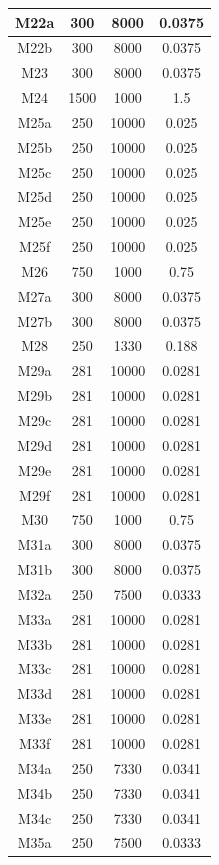 \documentclass[journal]{IEEEtran}
\begin{document}
\begin{table}
\begin{tabular}{|c|c|c|c|}
\hline M22a & 300 & 8000 & 0.0375 \\
\hline M22b & 300 & 8000 & 0.0375 \\
\hline M23 & 300 & 8000 & 0.0375 \\
\hline M24 & 1500 & 1000 & 1.5 \\
\hline M25a & 250 & 10000 & 0.025 \\
\hline M25b & 250 & 10000 & 0.025  \\
\hline M25c & 250 & 10000 & 0.025 \\
\hline M25d & 250 & 10000 & 0.025 \\
\hline M25e & 250 & 10000 & 0.025 \\
\hline M25f & 250 & 10000 & 0.025 \\
\hline M26 & 750 & 1000 & 0.75 \\
\hline M27a & 300 & 8000 & 0.0375 \\
\hline M27b & 300 & 8000 & 0.0375  \\
\hline M28 & 250 & 1330 & 0.188 \\
\hline M29a & 281 & 10000 & 0.0281 \\
\hline M29b & 281 & 10000 & 0.0281  \\
\hline M29c & 281 & 10000 & 0.0281 \\
\hline M29d & 281 & 10000 & 0.0281 \\
\hline M29e & 281 & 10000 & 0.0281 \\
\hline M29f & 281 & 10000 & 0.0281 \\
\hline M30 & 750 & 1000 & 0.75 \\
\hline M31a & 300 & 8000 & 0.0375 \\
\hline M31b & 300 & 8000 & 0.0375  \\
\hline M32a & 250 & 7500 & 0.0333  \\
\hline M33a & 281 & 10000 & 0.0281 \\
\hline M33b & 281 & 10000 & 0.0281   \\
\hline M33c & 281 & 10000 & 0.0281   \\
\hline M33d & 281 & 10000 & 0.0281   \\
\hline M33e & 281 & 10000 & 0.0281   \\
\hline M33f & 281 & 10000 & 0.0281  \\
\hline M34a & 250 & 7330 & 0.0341 \\
\hline M34b & 250 & 7330 & 0.0341  \\
\hline M34c & 250 & 7330 & 0.0341  \\
\hline M35a & 250 & 7500 & 0.0333 \\

\end{tabular}
\end{table}
\end{document}
